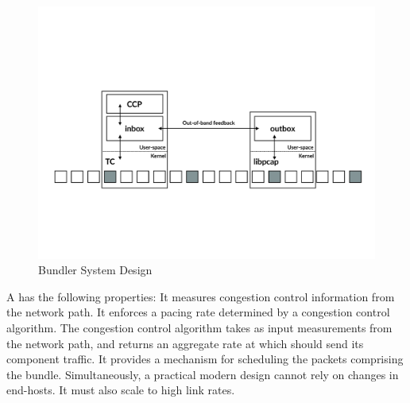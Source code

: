 \begin{figure}
    \centering
    \includegraphics[width=2\columnwidth]{img/bundler-diagram}
    \caption{Bundler System Design}\label{fig:bundler}
\end{figure}

\begin{outline}
\1 A \name has the following properties:
    \2 It measures congestion control information from the network path.
    \2 It enforces a pacing rate determined by a congestion control algorithm.
        \3 The congestion control algorithm takes as input measurements from the network path, and returns an aggregate rate at which \name should send its component traffic.
    \2 It provides a mechanism for scheduling the packets comprising the bundle.
\1 Simultaneously, a practical modern design cannot rely on changes in end-hosts.
\1 It must also scale to high link rates.
\end{outline}

